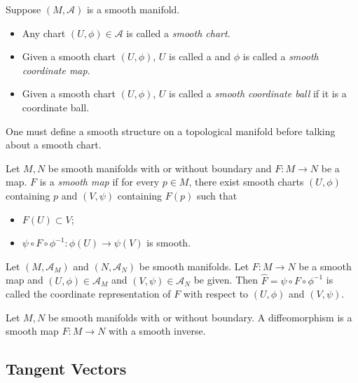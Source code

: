 \begin{defn}
  Suppose $(M, \mathcal{A})$ is a smooth manifold.
  \begin{itemize}
    \item
      Any chart $(U, \phi) \in \mathcal{A}$ is called a \textit{smooth chart}.
    \item
      Given a smooth chart $(U, \phi)$, $U$ is called a  and $\phi$ is called a \textit{smooth coordinate map}.
    \item
      Given a smooth chart $(U, \phi)$, $U$ is called a \textit{smooth coordinate ball} if it is a coordinate ball.
  \end{itemize}
\end{defn}

\begin{rem}
  One must define a smooth structure on a topological manifold before talking about a smooth chart.
\end{rem}

\begin{defn}
  Let $M, N$ be smooth manifolds with or without boundary and $F: M \rightarrow N$ be a map.
  $F$ is a \textit{smooth map} if for every $p \in M$, there exist smooth charts $(U, \phi)$ containing $p$ and $(V, \psi)$ containing $F(p)$ such that
  \begin{itemize}
    \item
      $F(U) \subset V$;
    \item
      $\psi \circ F \circ \phi^{-1}: \phi(U) \rightarrow \psi(V)$ is smooth.
  \end{itemize}
\end{defn}

\begin{defn}
  Let $(M, \mathcal{A}_M)$ and $(N, \mathcal{A}_N)$ be smooth manifolds.
  Let $F: M \rightarrow N$ be a smooth map and $(U, \phi) \in \mathcal{A}_M$ and $(V, \psi) \in \mathcal{A}_N$ be given.
  Then $\hat{F} = \psi \circ F \circ \phi^{-1}$ is called the coordinate representation of $F$ with respect to $(U, \phi)$ and $(V, \psi)$.
\end{defn}

\begin{defn}[Diffeomorphism]
  Let $M, N$ be smooth manifolds with or without boundary.
  A diffeomorphism is a smooth map $F: M \rightarrow N$ with a smooth inverse.
\end{defn}

\subsection{Tangent Vectors}

